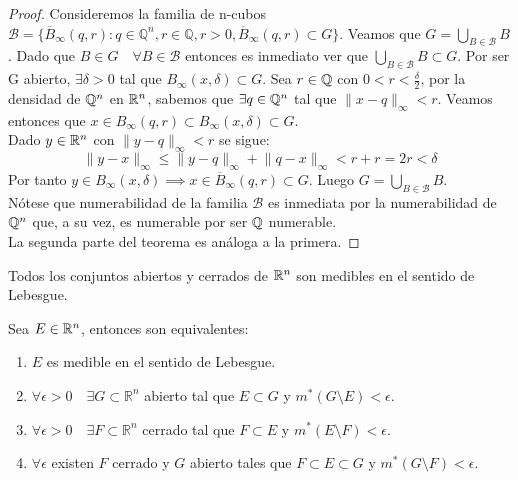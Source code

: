 \begin{proof}
    Consideremos la familia de n-cubos $\mathcal{B} = \{\overline{B}_\infty(q,r):q\in \mathbb{Q}^n, r \in \mathbb{Q}, r>0, \overline{B}_\infty(q,r) \subset G\}$. Veamos que $G = \bigcup_{B \in \mathcal{B}}B$. Dado que $B \in G \quad \forall B \in \mathcal{B}$ entonces es inmediato ver que $\bigcup_{B \in \mathcal{B}}B \subset G$. Por ser G abierto, $\exists \delta > 0$ tal que $B_{\infty}(x, \delta) \subset G$. Sea $r \in \mathbb{Q}$ con $0 < r < \frac{\delta}{2}$, por la densidad de $\mathbb{Q}^n$ en $\mathbb{R}^n$, sabemos que $\exists q \in \mathbb{Q}^n$ tal que $ \lVert x - q \rVert _{\infty} < r$. Veamos entonces que $x \in B_{\infty}(q, r) \subset B_{\infty}(x, \delta) \subset G$.\\
    Dado $y \in \mathbb{R}^n$ con $ \lVert y - q \rVert _{\infty} < r$ se sigue:
    \[
        \lVert y - x \rVert _{\infty} \leq  \lVert y - q \rVert _{\infty} +  \lVert q - x \rVert _{\infty} < r + r = 2r < \delta
    \]
    Por tanto $y \in B_{\infty}(x, \delta) \implies x \in \overline{B}_{\infty}(q,
        r) \subset G$. Luego $G = \bigcup_{B \in \mathcal{B}}B$.\\ Nótese que
    numerabilidad de la familia $\mathcal{B}$ es inmediata por la numerabilidad de
    $\mathbb{Q}^n$ que, a su vez, es numerable por ser $\mathbb{Q}$ numerable.\\ La segunda parte
    del teorema es análoga a la primera.
\end{proof}

\begin{corolario}
    Todos los conjuntos abiertos y cerrados de $\mathbb{R}^n$ son medibles en el sentido de Lebesgue.
    \label{abiertoMedible}
\end{corolario}

\begin{teorema} 
    Sea $E \in \mathbb{R}^n$, entonces son equivalentes:
    \begin{enumerate}
        \item $E$ es medible en el sentido de Lebesgue.
        \item $\forall \epsilon > 0 \quad \exists G \subset \mathbb{R}^n$ abierto tal que $E \subset G$ y $m^*(G \setminus E) < \epsilon$.
        \item $\forall \epsilon > 0 \quad \exists F \subset \mathbb{R}^n$ cerrado tal que $F \subset E$ y $m^*(E \setminus F) < \epsilon$.
        \item $\forall \epsilon$ existen $F$ cerrado y $G$ abierto tales que $F \subset E \subset G$ y $m^*(G \setminus F) < \epsilon$.
    \end{enumerate}
\end{teorema}

